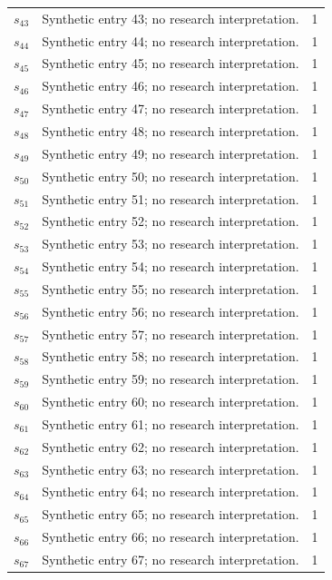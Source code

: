 \documentclass[11pt,a4paper]{article}
\begin{document}
\begin{longtable}{p{.15\linewidth}p{.55\linewidth}p{.15\linewidth}}
$s_{43}$ & Synthetic entry 43; no research interpretation. & 1 \\
$s_{44}$ & Synthetic entry 44; no research interpretation. & 1 \\
$s_{45}$ & Synthetic entry 45; no research interpretation. & 1 \\
$s_{46}$ & Synthetic entry 46; no research interpretation. & 1 \\
$s_{47}$ & Synthetic entry 47; no research interpretation. & 1 \\
$s_{48}$ & Synthetic entry 48; no research interpretation. & 1 \\
$s_{49}$ & Synthetic entry 49; no research interpretation. & 1 \\
$s_{50}$ & Synthetic entry 50; no research interpretation. & 1 \\
$s_{51}$ & Synthetic entry 51; no research interpretation. & 1 \\
$s_{52}$ & Synthetic entry 52; no research interpretation. & 1 \\
$s_{53}$ & Synthetic entry 53; no research interpretation. & 1 \\
$s_{54}$ & Synthetic entry 54; no research interpretation. & 1 \\
$s_{55}$ & Synthetic entry 55; no research interpretation. & 1 \\
$s_{56}$ & Synthetic entry 56; no research interpretation. & 1 \\
$s_{57}$ & Synthetic entry 57; no research interpretation. & 1 \\
$s_{58}$ & Synthetic entry 58; no research interpretation. & 1 \\
$s_{59}$ & Synthetic entry 59; no research interpretation. & 1 \\
$s_{60}$ & Synthetic entry 60; no research interpretation. & 1 \\
$s_{61}$ & Synthetic entry 61; no research interpretation. & 1 \\
$s_{62}$ & Synthetic entry 62; no research interpretation. & 1 \\
$s_{63}$ & Synthetic entry 63; no research interpretation. & 1 \\
$s_{64}$ & Synthetic entry 64; no research interpretation. & 1 \\
$s_{65}$ & Synthetic entry 65; no research interpretation. & 1 \\
$s_{66}$ & Synthetic entry 66; no research interpretation. & 1 \\
$s_{67}$ & Synthetic entry 67; no research interpretation. & 1 \\

\end{longtable}
\end{document}
